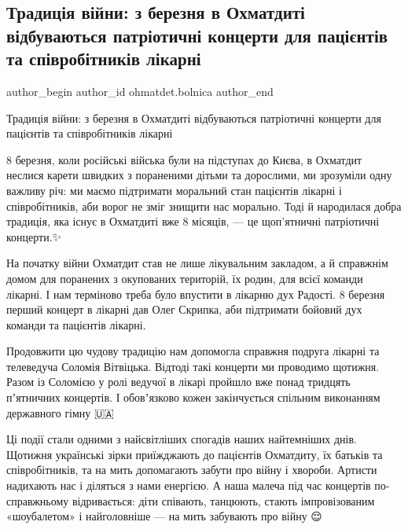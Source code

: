  
 
 
 
 
 
\subsection{Традиція війни: з березня в Охматдиті відбуваються патріотичні концерти для пацієнтів та співробітників лікарні}
\label{sec:04_11_2022.fb.ohmatdet.bolnica.1.koncerty}
 
\ifcmt
 author_begin
   author_id ohmatdet.bolnica
 author_end
\fi

Традиція війни: з березня в Охматдиті відбуваються патріотичні концерти для
пацієнтів та співробітників лікарні💙💛

8 березня, коли російські війська були на підступах до Києва, в Охматдит
неслися карети швидких з пораненими дітьми та дорослими, ми зрозуміли одну
важливу річ: ми маємо підтримати моральний стан пацієнтів лікарні і
співробітників, аби ворог не зміг знищити нас морально. Тоді й народилася добра
традиція, яка існує в Охматдиті вже 8 місяців, — це щоп'ятничні патріотичні
концерти.✨

На початку війни Охматдит став не лише лікувальним закладом, а й справжнім
домом для поранених з окупованих територій, їх родин, для всієї команди
лікарні. І нам терміново треба було впустити в лікарню дух Радості. 8 березня
перший концерт в лікарні дав Олег Скрипка, аби підтримати бойовий дух команди
та пацієнтів лікарні.🤍

Продовжити цю чудову традицію нам допомогла справжня подруга лікарні та
телеведуча Соломія Вітвіцька. Відтоді такі концерти ми проводимо щотижня. Разом
із Соломією у ролі ведучої в лікарі пройшло вже понад тридцять пʼятничних
концертів. І обовʼязково кожен закінчується спільним виконанням державного
гімну 🇺🇦

Ці події стали одними з найсвітліших спогадів наших найтемніших днів. Щотижня
українські зірки приїжджають до пацієнтів Охматдиту, їх батьків та
співробітників, та на мить допомагають забути про війну і хвороби. Артисти
надихають нас і діляться з нами енергією. А наша малеча під час концертів
по-справжньому відривається: діти співають, танцюють, стають імпровізованим
«шоубалетом» і найголовніше — на мить забувають про війну 😌

